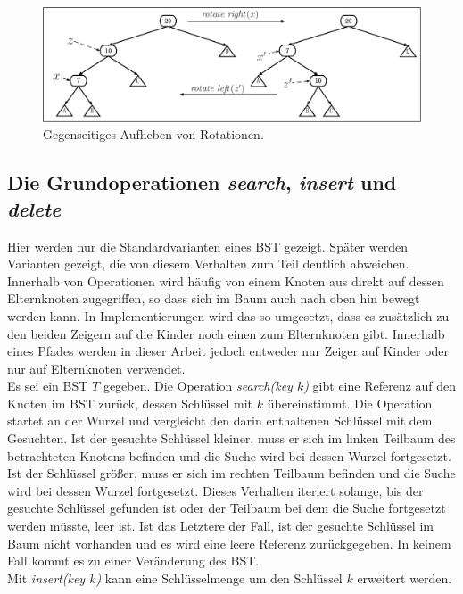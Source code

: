 \documentclass[a4paper,12pt]{article}
\begin{document}
\begin{figure}[H]
	\centering
	\includegraphics[width= 1\textwidth]{Medien/Einleitung/LinksRechtsRotation}
	\caption{Gegenseitiges Aufheben von Rotationen.}
	\label{fig:LinksRechtsRotation}
\end{figure}

\subsection{Die Grundoperationen \textit{search}, \textit{insert} und \textit{delete}} \label{BST Operationen}
Hier werden nur die Standardvarianten eines BST gezeigt. Später werden Varianten gezeigt, die von diesem Verhalten zum Teil deutlich abweichen. Innerhalb von Operationen wird häufig von einem Knoten aus direkt
auf dessen Elternknoten zugegriffen, so dass sich im Baum auch nach oben hin bewegt werden kann. In Implementierungen wird das so umgesetzt, dass es zusätzlich zu den beiden Zeigern auf die Kinder noch einen zum Elternknoten gibt. Innerhalb eines Pfades werden in dieser Arbeit jedoch entweder nur Zeiger auf Kinder oder nur auf Elternknoten verwendet.\\
 Es sei ein BST $T$ gegeben. Die Operation \textit{search(key $k$)} gibt eine Referenz auf den Knoten im BST zurück, dessen Schlüssel mit $k$ übereinstimmt. Die Operation startet an der Wurzel und vergleicht den darin enthaltenen Schlüssel mit dem Gesuchten. Ist der gesuchte Schlüssel kleiner, muss er sich im linken Teilbaum des betrachteten Knotens befinden und die Suche wird bei dessen Wurzel fortgesetzt. Ist der Schlüssel größer, muss er sich im rechten Teilbaum befinden und die Suche wird bei dessen Wurzel fortgesetzt. Dieses Verhalten iteriert solange, bis der gesuchte Schlüssel gefunden ist oder der Teilbaum bei dem die Suche fortgesetzt werden müsste, leer ist. Ist das Letztere der Fall, ist der gesuchte Schlüssel im Baum nicht vorhanden und es wird eine leere Referenz zurückgegeben. In keinem Fall kommt es zu einer Veränderung des BST.\\
Mit \textit{insert(key $k$)}  kann eine Schlüsselmenge um den Schlüssel $k$ erweitert werden. 
\end{document}
